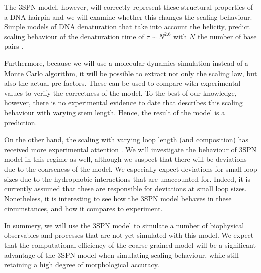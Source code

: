 The 3SPN model, however, will correctly represent these structural properties of a DNA hairpin and we will examine whether this changes the scaling behaviour. Simple models of DNA denaturation that take into account the helicity, predict scaling behaviour of the denaturation time of $\tau \sim N^{2.6}$ with $N$ the number of base pairs \cite{carlon2010unwinding}. 

Furthermore, because we will use a molecular dynamics simulation instead of a Monte Carlo algorithm, it will be possible to extract not only the scaling law, but also the actual pre-factors. These can be used to compare with experimental values to verify the correctness of the model. To the best of our knowledge, however, there is no experimental evidence to date that describes this scaling behaviour with varying stem length. Hence, the result of the model is a prediction.

On the other hand, the scaling with varying loop length (and composition) has received more experimental attention \cite{bonnet1998kinetics}. We will investigate the behaviour of 3SPN model in this regime as well, although we suspect that there will be deviations due to the coarseness of the model. We especially expect deviations for small loop sizes due to the hydrophobic interactions that are unaccounted for. Indeed, it is currently assumed \cite{vallone1999melting, shen2001loop} that these are responsible for deviations at small loop sizes. Nonetheless, it is interesting to see how the 3SPN model behaves in these circumstances, and how it compares to experiment.

In summery, we will use the 3SPN model to simulate a number of biophysical observables and processes that are not yet simulated with this model. We expect that the computational efficiency of the coarse grained model will be a significant advantage of the 3SPN model when simulating scaling behaviour, while still retaining a high degree of morphological accuracy.
